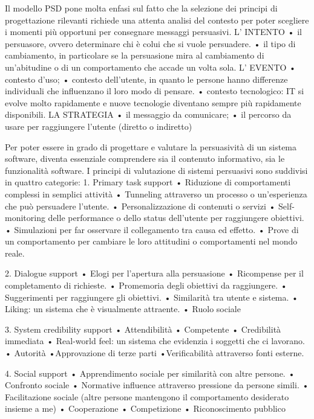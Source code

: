 Il modello PSD pone molta enfasi sul fatto che la selezione dei principi di progettazione rilevanti richiede una attenta analisi del contesto per poter scegliere i momenti più opportuni per consegnare messaggi persuasivi.
L' INTENTO
• il persuasore, ovvero determinare chi è colui che si vuole persuadere.
• il tipo di cambiamento, in particolare se la persuasione mira al cambiamento di un'abitudine o di un comportamento che accade un volta sola.
L' EVENTO
• contesto d'uso;
• contesto dell'utente, in quanto le persone hanno differenze individuali che influenzano il loro modo di pensare.
• contesto tecnologico: IT si evolve molto rapidamente e nuove tecnologie diventano sempre più rapidamente disponibili.
LA STRATEGIA
• il messaggio da comunicare;
• il percorso da usare per raggiungere l'utente (diretto o indiretto)

Per poter essere in grado di progettare e valutare la persuasività di un sistema software, diventa essenziale comprendere sia il contenuto informativo, sia le funzionalità software. I principi di valutazione di sistemi persuasivi sono suddivisi in quattro categorie:
1. Primary task support
• Riduzione di comportamenti complessi in semplici attività
• Tunneling attraverso un processo o un'esperienza che può persuadere l'utente.
• Personalizzazione di contenuti o servizi
• Self-monitoring delle performance o dello status dell'utente per raggiungere obiettivi.
• Simulazioni per far osservare il collegamento tra causa ed effetto.
• Prove di un comportamento per cambiare le loro attitudini o comportamenti nel mondo reale.

2. Dialogue support
• Elogi per l'apertura alla persuasione
• Ricompense per il completamento di richieste.
• Promemoria degli obiettivi da raggiungere.
• Suggerimenti per raggiungere gli obiettivi.
• Similarità tra utente e sistema.
• Liking: un sistema che è visualmente attraente.
• Ruolo sociale

3. System credibility support
• Attendibilità
• Competente
• Credibilità immediata
• Real-world feel: un sistema che evidenzia i soggetti che ci lavorano.
• Autorità
•Approvazione di terze parti
•Verificabilità attraverso fonti esterne.

4. Social support
• Apprendimento sociale per similarità con altre persone.
• Confronto sociale
• Normative influence attraverso pressione da persone simili.
• Facilitazione sociale (altre persone mantengono il comportamento desiderato insieme a me)
• Cooperazione
• Competizione
• Riconoscimento pubblico


